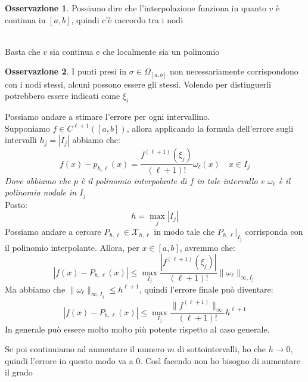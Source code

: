 \documentclass[11pt,a4paper,twoside]{article}
\theoremstyle{definition}
\newtheorem*{oss}{Osservazione}
\begin{document}
\begin{oss}
	Possiamo dire che l'interpolazione funziona in quanto $v$ è continua in $[a,b]$, quindi c'è raccordo tra i nodi
\end{oss}

\begin{center}
	\\
	Basta che $v$ sia continua e che localmente sia un polinomio
\end{center}

\begin{oss}
	I punti presi in $\sigma \in \Omega_{[a,b]}$ non necessariamente corrispondono con i nodi stessi, alcuni possono essere gli stessi. Volendo per distinguerli potrebbero essere indicati come $\xi_i$
\end{oss}

Possiamo andare a stimare l'errore per ogni intervallino.\\
Supponiamo $f \in C^{\ell + 1}([a,b])$, allora applicando la formula dell'errore sugli intervalli $h_j = |I_j|$ abbiamo che:
\[ f(x)-p_{h, \ell}(x) = \frac{f^{(\ell + 1)}(\xi_j)}{(\ell+1)!}\omega_\ell(x)\quad x \in I_j\]
\textit{Dove abbiamo che $p$ è il polinomio interpolante di $f$ in tale intervallo e $\omega_\ell$ è il polinomio nodale in $I_j$}\\
Posto:
\[h = \max_j |I_j|\]
Possiamo andare a cercare $P_{h, \ell} \in \mathcal X_{h, \ell}$ in modo tale che $P_{h, \ell}|_{I_j}$ corrisponda con il polinomio interpolante. Allora, per $x \in [a,b]$, avremmo che:
\[|f(x)-P_{h, \ell}(x)| \leq \max_{I_j} \frac{|f^{(\ell+1)}(\xi_j)|}{(\ell+1)!} \|\omega_\ell\|_{\infty, I_j}\]
Ma abbiamo che $\|\omega_\ell\|_{\infty, I_j}\leq h^{\ell+1}$, quindi l'errore finale può diventare:
\[|f(x)-P_{h, \ell}(x)| \leq \max_{I_j} \frac{\|f^{(\ell+1)}\|_\infty}{(\ell+1)!} h^{\ell +1} \]
In generale può essere molto molto più potente rispetto al caso generale.

Se poi continuiamo ad aumentare il numero $m$ di sottointervalli, ho che $h \to 0$, quindi l'errore in questo modo va a $0$. Così facendo non ho bisogno di aumentare il grado
\end{document}
